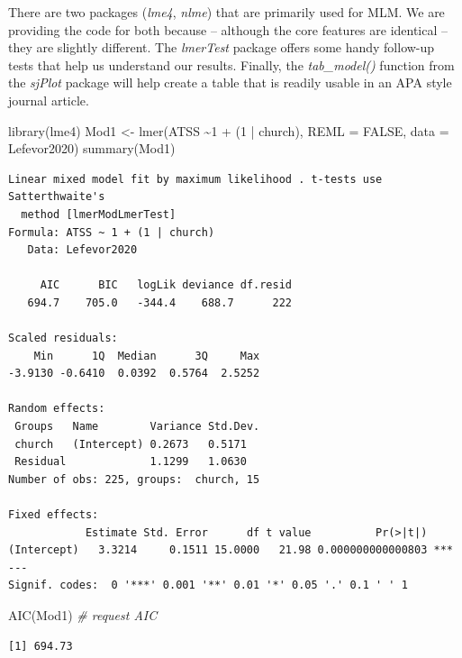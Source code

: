\documentclass[
  11pt,
]{book}
\newenvironment{Shaded}{\begin{snugshade}}{\end{snugshade}}
\newcommand{\AttributeTok}[1]{\textcolor[rgb]{0.77,0.63,0.00}{#1}}
\newcommand{\CommentTok}[1]{\textcolor[rgb]{0.56,0.35,0.01}{\textit{#1}}}
\newcommand{\ConstantTok}[1]{\textcolor[rgb]{0.00,0.00,0.00}{#1}}
\newcommand{\DecValTok}[1]{\textcolor[rgb]{0.00,0.00,0.81}{#1}}
\newcommand{\FunctionTok}[1]{\textcolor[rgb]{0.00,0.00,0.00}{#1}}
\newcommand{\NormalTok}[1]{#1}
\newcommand{\OtherTok}[1]{\textcolor[rgb]{0.56,0.35,0.01}{#1}}
\newcommand{\SpecialCharTok}[1]{\textcolor[rgb]{0.00,0.00,0.00}{#1}}
\begin{document}
There are two packages (\emph{lme4}, \emph{nlme}) that are primarily used for MLM. We are providing the code for both because -- although the core features are identical -- they are slightly different. The \emph{lmerTest} package offers some handy follow-up tests that help us understand our results. Finally, the \emph{tab\_model()} function from the \emph{sjPlot} package will help create a table that is readily usable in an APA style journal article.

\begin{Shaded}
\begin{Highlighting}[]
\FunctionTok{library}\NormalTok{(lme4)}
\NormalTok{Mod1 }\OtherTok{\textless{}{-}} \FunctionTok{lmer}\NormalTok{(ATSS }\SpecialCharTok{\textasciitilde{}}\DecValTok{1} \SpecialCharTok{+}\NormalTok{ (}\DecValTok{1} \SpecialCharTok{|}\NormalTok{ church), }\AttributeTok{REML =} \ConstantTok{FALSE}\NormalTok{, }\AttributeTok{data =}\NormalTok{ Lefevor2020)}
\FunctionTok{summary}\NormalTok{(Mod1)}
\end{Highlighting}
\end{Shaded}

\begin{verbatim}
Linear mixed model fit by maximum likelihood . t-tests use Satterthwaite's
  method [lmerModLmerTest]
Formula: ATSS ~ 1 + (1 | church)
   Data: Lefevor2020

     AIC      BIC   logLik deviance df.resid 
   694.7    705.0   -344.4    688.7      222 

Scaled residuals: 
    Min      1Q  Median      3Q     Max 
-3.9130 -0.6410  0.0392  0.5764  2.5252 

Random effects:
 Groups   Name        Variance Std.Dev.
 church   (Intercept) 0.2673   0.5171  
 Residual             1.1299   1.0630  
Number of obs: 225, groups:  church, 15

Fixed effects:
            Estimate Std. Error      df t value          Pr(>|t|)    
(Intercept)   3.3214     0.1511 15.0000   21.98 0.000000000000803 ***
---
Signif. codes:  0 '***' 0.001 '**' 0.01 '*' 0.05 '.' 0.1 ' ' 1
\end{verbatim}

\begin{Shaded}
\begin{Highlighting}[]
\FunctionTok{AIC}\NormalTok{(Mod1) }\CommentTok{\# request AIC}
\end{Highlighting}
\end{Shaded}

\begin{verbatim}
[1] 694.73
\end{verbatim}
\end{document}
